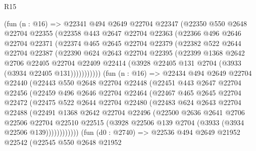 \begin{lexlean}{R15}
\begin{coremodule}
        (fun (n : @16) =>
        @22341
          @494
          @2649
          @22704
          @22347
          (@22350
            @550
            @2648
            @22704
            @22355
            (@22358
              @443
              @2647
              @22704
              @22363
              (@22366
                @496
                @2646
                @22704
                @22371
                (@22374
                  @465
                  @2645
                  @22704
                  @22379
                  (@22382
                    @522
                    @2644
                    @22704
                    @22387
                    (@22390
                      @624
                      @2643
                      @22704
                      @22395
                      (@22399
                        @1368
                        @2642
                        @2706
                        @22405
                        @22704
                        @22409
                        @22414
                        (@3928 @22405 @131 @2704 (@3933 (@3934 @22405 @131)))))))))))
        (fun (n : @16) =>
        @22434
          @494
          @2649
          @22704
          @22440
          (@22443
            @550
            @2648
            @22704
            @22448
            (@22451
              @443
              @2647
              @22704
              @22456
              (@22459
                @496
                @2646
                @22704
                @22464
                (@22467
                  @465
                  @2645
                  @22704
                  @22472
                  (@22475
                    @522
                    @2644
                    @22704
                    @22480
                    (@22483
                      @624
                      @2643
                      @22704
                      @22488
                      (@22491
                        @1368
                        @2642
                        @22704
                        @22496
                        (@22500
                          @2636
                          @2641
                          @2706
                          @22506
                          @22704
                          @22510
                          @22515
                          (@3928 @22506 @139 @2704 (@3933 (@3934 @22506 @139))))))))))))
        (fun (d0 : @2740) =>
        @22536
          @494
          @2649
          @21952
          @22542
          (@22545
            @550
            @2648
            @21952

\end{coremodule}
\end{lexlean}
